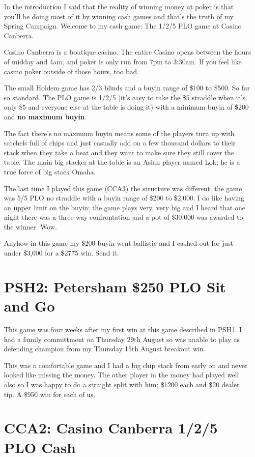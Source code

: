 In the introduction I said that the reality of winning money at poker
is that you'll be doing most of it by winning cash games and that's
the truth of my Spring Campaign. Welcome to my cash game: The 1/2/5
PLO game at Casino Canberra.

Casino Canberra is a boutique casino. The entire Casino opens between
the hours of midday and 4am; and poker is only run from 7pm to
3:30am. If you feel like casino poker outside of those hours, too bad.

The small Holdem game has 2/3 blinds and a buyin range of \$100 to
\$500. So far so standard. The PLO game is 1/2/5 (it's easy to take
the \$5 straddle when it's only \$5 and everyone else at the table is
doing it) with a minimum buyin of \$200 and \textbf{no maximum buyin}.

The fact there's no maximum buyin means some of the players turn up
with satchels full of chips and just casually add on a few thousand
dollars to their stack when they take a beat and they want to make
sure they still cover the table. The main big stacker at the table is
an Asian player named Lok; he is a true force of big stack Omaha.

The last time I played this game (CCA3) the structure was different;
the game was 5/5 PLO no straddle with a buyin range of \$200 to
\$2,000. I do like having an upper limit on the buyin; the game plays
very, very big and I heard that one night there was a three-way
confrontation and a pot of \$30,000 was awarded to the winner. Wow.

Anyhow in this game my \$200 buyin went ballistic and I cashed out for
just under \$3,000 for a \$2775 win. Send it.

\section*{PSH2: Petersham \$250 PLO Sit and Go}

This game was four weeks after my first win at this game described in
PSH1. I had a family committment on Thursday 29th August so was unable
to play as defending champion from my Thursday 15th August breakout
win.

This was a comfortable game and I had a big chip stack from early on
and never looked like missing the money. The other player in the money
had played well also so I was happy to do a straight split with him;
\$1200 each and \$20 dealer tip. A \$950 win for each of us.

\section*{CCA2: Casino Canberra 1/2/5 PLO Cash}

